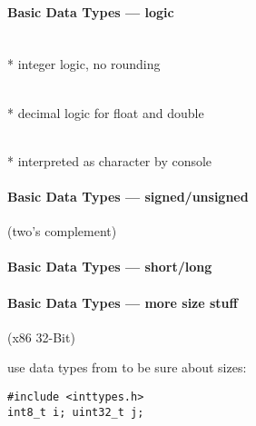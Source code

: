 \paragraph{Basic Data Types --- logic}
\begin{items}
  \item {} \\*
    integer logic, no rounding
  \item {} \\*
    decimal logic for float and double
  \item {} \\*
     interpreted as character by console
\end{items}

\paragraph{Basic Data Types --- signed/unsigned}
\begin{items}
  \item {} (two's complement)
  \item {}
\end{items}

\paragraph{Basic Data Types --- short/long}
\begin{items}
  \item {}
  \item {}
\end{items}

\paragraph{Basic Data Types --- more size stuff}
\begin{items}
  \item {} (x86 32-Bit)
  \item use data types from  to be sure about sizes:
  \begin{lstlisting}[style=customc]
#include <inttypes.h>
int8_t i; uint32_t j;
  \end{lstlisting}
\end{items}

